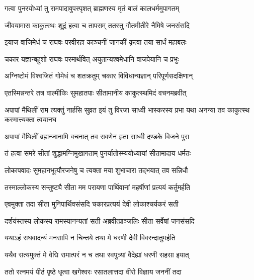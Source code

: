 \twolineshloka
{गत्वा पुनरयोध्यां तु रामपादावुपस्पृशत्}
{ब्राह्मणस्य मृतं बालं कालधर्ममुपागतम्}%

\twolineshloka
{जीवयामास काकुत्स्थः शूद्रं हत्वा च तापसम्}
{ततस्तु गौतमीतीरे नैमिषे जनसंसदि}%

\twolineshloka
{इयाज वाजिमेधं च राघवः परवीरहा}
{काञ्चनीं जानकीं कृत्वा तया सार्धं महाबलः}%

\twolineshloka
{चकार यज्ञान्बहुशो राघवः परमार्थवित्}
{अयुतान्यश्वमेधानि वाजपेयानि च प्रभुः}%

\twolineshloka
{अग्निष्टोमं विश्वजितं गोमेधं च शतक्रतुम्}
{चकार विविधान्यज्ञान् परिपूर्णसदक्षिणान्}%

\twolineshloka
{एतस्मिन्नन्तरे तत्र वाल्मीकिः सुमहातपाः}
{सीतामानीय काकुत्स्थमिदं वचनमब्रवीत्}%



\threelineshloka
{अपापां मैथिलीं राम त्यक्तुं नार्हसि सुव्रत}
{इयं तु विरजा साध्वी भास्करस्य प्रभा यथा}
{अनन्या तव काकुत्स्थ कस्मात्त्यक्ता त्वयानघ}%


\twolineshloka
{अपापां मैथिलीं ब्रह्मन्जानामि वचनात् तव}
{रावणेन हृता साध्वी दण्डके विजने पुरा}%

\twolineshloka
{तं हत्वा समरे सीतां शुद्धामग्निमुखागताम्}
{पुनर्यातोस्म्ययोध्यायां सीतामादाय धर्मतः}%

\twolineshloka
{लोकापवादः सुमहानभूत्पौरजनेषु च}
{त्यक्ता मया शुभाचारा तद्भयात् तव सन्निधौ}%

\twolineshloka
{तस्माल्लोकस्य सन्तुष्ट्यै सीता मम परायणा}
{पार्थिवानां महर्षीणां प्रत्ययं कर्तुमर्हति}%


\twolineshloka
{एवमुक्ता तदा सीता मुनिपार्थिवसंसदि}
{चकारप्रत्ययं देवी लोकाश्चर्यकरं सती}%

\twolineshloka
{दर्शयंस्तस्य लोकस्य रामस्यानन्यतां सती}
{अब्रवीत्प्राञ्जलिः सीता सर्वेषां जनसंसदि}%


\twolineshloka
{यथाऽहं राघवादन्यं मनसापि न चिन्तये}
{तथा मे धरणी देवी विवरन्दातुमर्हति}%

\twolineshloka
{यथैव सत्यमुक्तं मे वेद्मि रामात्परं न च}
{तथा स्वपुत्र्यां वैदेह्यां धरणी सहसा इयात्}%


\twolineshloka
{ततो रत्नमयं पीठं पृष्ठे धृत्वा खगेश्वरः}
{रसातलात्तदा वीरो विज्ञाय जननीं तदा}%

